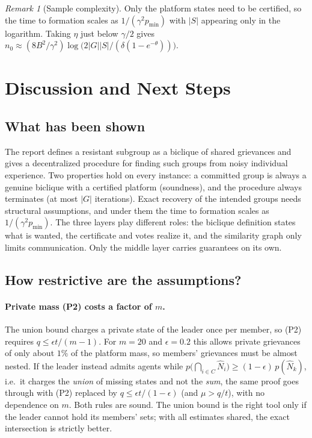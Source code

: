 \documentclass[11pt]{article}
\theoremstyle{plain}
\theoremstyle{definition}
\theoremstyle{remark}
\newtheorem{remark}[theorem]{Remark}
\begin{document}
\begin{remark}[Sample complexity]
Only the platform states need to be certified, so the time to formation scales as $1/(\gamma^2p_{\min})$ with $|S|$ appearing only in the logarithm.
Taking $\eta$ just below $\gamma/2$ gives $n_0\approx(8B^2/\gamma^2)\log\big(2|G||S|/(\delta(1-e^{-\theta}))\big)$.
\end{remark}
 
\section{Discussion and Next Steps}\label{sec:discussion}
 
\subsection{What has been shown}
The report defines a resistant subgroup as a biclique of shared grievances and gives a decentralized procedure for finding such groups from noisy individual experience.
Two properties hold on every instance: a committed group is always a genuine biclique with a certified platform (soundness), and the procedure always terminates (at most $|G|$ iterations).
Exact recovery of the intended groups needs structural assumptions, and under them the time to formation scales as $1/(\gamma^2 p_{\min})$.
The three layers play different roles: the biclique definition states what is wanted, the certificate and votes realize it, and the similarity graph only limits communication. Only the middle layer carries guarantees on its own.
 
\subsection{How restrictive are the assumptions?}
\paragraph{Private mass (P2) costs a factor of $m$.}
The union bound charges a private state of the leader once per member, so (P2) requires $q\le\epsilon t/(m-1)$.
For $m=20$ and $\epsilon=0.2$ this allows private grievances of only about $1\%$ of the platform mass, so members' grievances must be almost nested.
If the leader instead admits agents while $p\big(\bigcap_{i\in C}\hat N_i\big)\ge(1-\epsilon)\,p(\hat N_k)$, i.e.\ it charges the \emph{union} of missing states and not the \emph{sum},
the same proof goes through with (P2) replaced by $q\le\epsilon t/(1-\epsilon)$ (and $\mu>q/t$), with no dependence on $m$. Both rules are sound. The union bound is the right tool only if the leader cannot hold its members' sets;
with all estimates shared, the exact intersection is strictly better.
 
\end{document}
